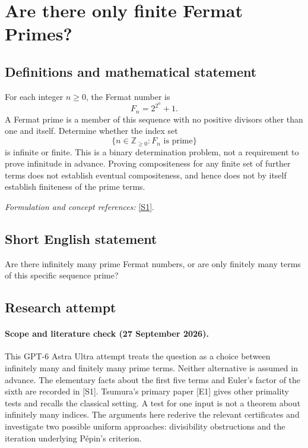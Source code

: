\documentclass[11pt]{article}
\begin{document}
\section*{\texorpdfstring{Are there only finite Fermat Primes?}{Are there only finite Fermat Primes?}}\label{3373}
\subsection{Definitions and mathematical statement}
For each integer $n\ge0$, the Fermat number is
\[
 F_n=2^{2^n}+1.
\]
A Fermat prime is a member of this sequence with no positive divisors other than one and itself. Determine whether the index set
\[
 \{n\in{\mathbb{Z}}_{\ge0}:F_n\text{ is prime}\}
\]
is infinite or finite. This is a binary determination problem, not a requirement to prove infinitude in advance. Proving compositeness for any finite set of further terms does not establish eventual compositeness, and hence does not by itself establish finiteness of the prime terms.
\par\smallskip\textit{Formulation and concept references:} \href{https://webusers.imj-prg.fr/~michel.waldschmidt/articles/pdf/NTchallengesVI.pdf}{[S1]}.

\subsection{Short English statement}
Are there infinitely many prime Fermat numbers, or are only finitely many terms of this specific sequence prime?
\subsection{Research attempt}
\paragraph{Scope and literature check (27 September 2026).}
This GPT-6 Astra Ultra attempt treats the question as a choice between
infinitely many and finitely many prime terms. Neither alternative is
assumed in advance. The elementary facts about the first five terms and
Euler's factor of the sixth are recorded in [S1]. Tsumura's primary
paper [E1] gives other primality tests and recalls the classical setting.
A test for one input is not a theorem about infinitely many indices.
The arguments here rederive the relevant certificates and investigate
two possible uniform approaches: divisibility obstructions and the
iteration underlying P\'epin's criterion.
\end{document}
